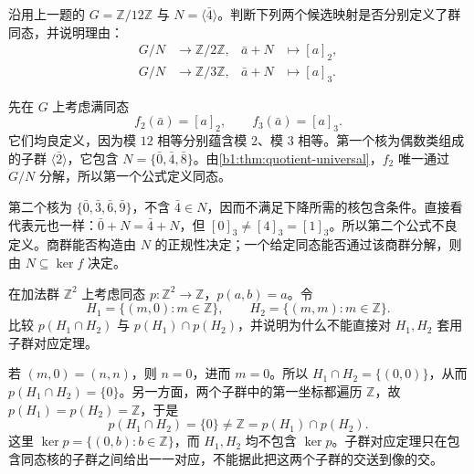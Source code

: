 \begin{exercise}\label{b1:ex:02-quotient-map-descend}
	沿用上一题的 \(G=\mathbb Z/12\mathbb Z\) 与 \(N=\langle\bar4\rangle\)。判断下列两个候选映射是否分别定义了群同态，并说明理由：
	\[
		\begin{aligned}
			G/N&\longrightarrow\mathbb Z/2\mathbb Z,& \bar a+N&\longmapsto[a]_2,\\
			G/N&\longrightarrow\mathbb Z/3\mathbb Z,& \bar a+N&\longmapsto[a]_3.
		\end{aligned}
	\]
\end{exercise}
\begin{solution}
	先在 \(G\) 上考虑满同态
	\[
		f_2(\bar a)=[a]_2,\qquad f_3(\bar a)=[a]_3.
	\]
	它们均良定义，因为模 \(12\) 相等分别蕴含模 \(2\)、模 \(3\) 相等。第一个核为偶数类组成的子群 \(\langle\bar2\rangle\)，它包含 \(N=\{\bar0,\bar4,\bar8\}\)。由\cref{b1:thm:quotient-universal}，\(f_2\) 唯一通过 \(G/N\) 分解，所以第一个公式定义同态。

	第二个核为 \(\{\bar0,\bar3,\bar6,\bar9\}\)，不含 \(\bar4\in N\)，因而不满足下降所需的核包含条件。直接看代表元也一样：\(\bar0+N=\bar4+N\)，但 \([0]_3\ne[4]_3=[1]_3\)。所以第二个公式不良定义。商群能否构造由 \(N\) 的正规性决定；一个给定同态能否通过该商群分解，则由 \(N\subseteq\ker f\) 决定。
\end{solution}

\begin{exercise}\label{b1:ex:02-image-intersection-counterexample}
	在加法群 \(\mathbb Z^2\) 上考虑同态 \(p:\mathbb Z^2\rightarrow\mathbb Z\)，\(p(a,b)=a\)。令
	\[
		H_1=\{(m,0):m\in\mathbb Z\},\qquad H_2=\{(m,m):m\in\mathbb Z\}.
	\]
	比较 \(p(H_1\cap H_2)\) 与 \(p(H_1)\cap p(H_2)\)，并说明为什么不能直接对 \(H_1,H_2\) 套用子群对应定理。
\end{exercise}
\begin{solution}
	若 \((m,0)=(n,n)\)，则 \(n=0\)，进而 \(m=0\)。所以 \(H_1\cap H_2=\{(0,0)\}\)，从而 \(p(H_1\cap H_2)=\{0\}\)。另一方面，两个子群中的第一坐标都遍历 \(\mathbb Z\)，故 \(p(H_1)=p(H_2)=\mathbb Z\)，于是
	\[
		p(H_1\cap H_2)=\{0\}\ne\mathbb Z=p(H_1)\cap p(H_2).
	\]
	这里 \(\ker p=\{(0,b):b\in\mathbb Z\}\)，而 \(H_1,H_2\) 均不包含 \(\ker p\)。子群对应定理只在包含同态核的子群之间给出一一对应，不能据此把这两个子群的交送到像的交。
\end{solution}
